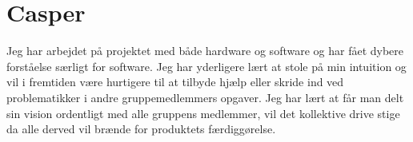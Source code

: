 \section{Casper}

Jeg har arbejdet på projektet med både hardware og software og har fået dybere forståelse særligt for software. Jeg har yderligere lært at stole på min intuition og vil i fremtiden være hurtigere til at tilbyde hjælp eller skride ind ved problematikker i andre gruppemedlemmers opgaver. Jeg har lært at får man delt sin vision ordentligt med alle gruppens medlemmer, vil det kollektive drive stige da alle derved vil brænde for produktets færdiggørelse.